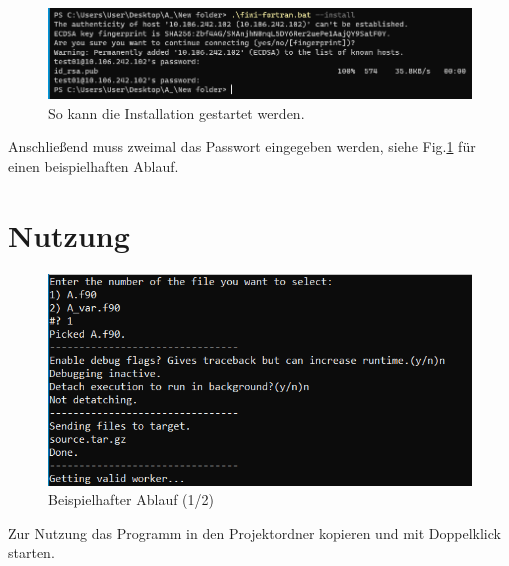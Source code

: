 \documentclass[11pt, a4paper]{article}
\begin{document}
\begin{figure}[h]
    \centering
    \includegraphics[width=1\linewidth]{./pics/2022-03-08_23-57.png}
    \caption{So kann die Installation gestartet werden.}
    \label{fig:install-2}
\end{figure}

Anschließend muss zweimal das Passwort eingegeben werden, siehe Fig.\ref{fig:install-2} für einen beispielhaften Ablauf.





\clearpage


\section{Nutzung}

\begin{figure}[htb!]
    \centering
    \includegraphics[width=0.7\linewidth]{./pics/2022-03-08_23-59_1.png}
    \caption{Beispielhafter Ablauf (1/2)}
    \label{fig:usage}
\end{figure}

Zur Nutzung das Programm in den Projektordner kopieren und mit Doppelklick starten.
\end{document}
